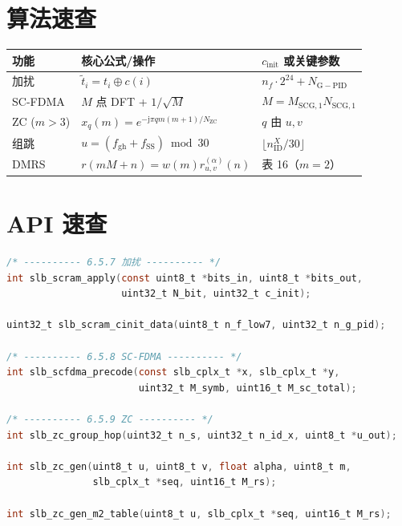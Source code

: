 \documentclass[11pt,a4paper]{ctexart}
\newcommand{\NGPID}{N_{\mathrm{G-PID}}}
\begin{document}
\section{算法速查}

\begin{table}[h]
\centering
\small
\begin{tabular}{lll}
\toprule
\textbf{功能} & \textbf{核心公式/操作} & \textbf{$c_{\mathrm{init}}$ 或关键参数} \\
\midrule
加扰 & $\tilde{t}_i=t_i\oplus c(i)$ & $n_f\cdot 2^{24}+\NGPID$ \\
SC-FDMA & $M$ 点 DFT + $1/\sqrt{M}$ & $M=M_{\mathrm{SCG},1}N_{\mathrm{SCG},1}$ \\
ZC ($m>3$) & $x_q(m)=e^{-\mathrm{j}\pi qm(m+1)/N_{\mathrm{ZC}}}$ & $q$ 由 $u,v$ \\
组跳 & $u=(f_{\mathrm{gh}}+f_{\mathrm{SS}})\bmod 30$ & $\lfloor n_{\mathrm{ID}}^{X}/30\rfloor$ \\
DMRS & $r(mM+n)=w(m)r_{u,v}^{(\alpha)}(n)$ & 表 16（$m=2$） \\
\bottomrule
\end{tabular}
\end{table}

\section{API 速查}

\begin{lstlisting}[language=C]
/* ---------- 6.5.7 加扰 ---------- */
int slb_scram_apply(const uint8_t *bits_in, uint8_t *bits_out,
                    uint32_t N_bit, uint32_t c_init);

uint32_t slb_scram_cinit_data(uint8_t n_f_low7, uint32_t n_g_pid);

/* ---------- 6.5.8 SC-FDMA ---------- */
int slb_scfdma_precode(const slb_cplx_t *x, slb_cplx_t *y,
                       uint32_t M_symb, uint16_t M_sc_total);

/* ---------- 6.5.9 ZC ---------- */
int slb_zc_group_hop(uint32_t n_s, uint32_t n_id_x, uint8_t *u_out);

int slb_zc_gen(uint8_t u, uint8_t v, float alpha, uint8_t m,
               slb_cplx_t *seq, uint16_t M_rs);

int slb_zc_gen_m2_table(uint8_t u, slb_cplx_t *seq, uint16_t M_rs);
\end{lstlisting}
\end{document}
